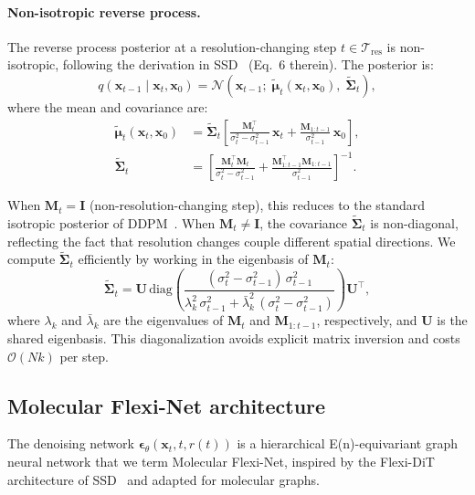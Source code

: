\documentclass[11pt]{article}
\newcommand{\vx}{\mathbf{x}}
\newcommand{\ve}{\boldsymbol{\epsilon}}
\newcommand{\mM}{\mathbf{M}}
\newcommand{\mI}{\mathbf{I}}
\newcommand{\mU}{\mathbf{U}}
\newcommand{\normal}{\mathcal{N}}
\begin{document}
\paragraph{Non-isotropic reverse process.}
The reverse process posterior at a resolution-changing step $t \in \mathcal{T}_{\text{res}}$ is non-isotropic, following the derivation in SSD~\cite{ssd2026} (Eq.~6 therein). The posterior is:
\begin{equation}
\label{eq:posterior}
    q(\vx_{t-1} \mid \vx_t, \vx_0) = \normal\!\left(\vx_{t-1};\; \tilde{\boldsymbol{\mu}}_t(\vx_t, \vx_0),\; \tilde{\boldsymbol{\Sigma}}_t\right),
\end{equation}
where the mean and covariance are:
\begin{align}
    \tilde{\boldsymbol{\mu}}_t(\vx_t, \vx_0) &= \tilde{\boldsymbol{\Sigma}}_t \left[\frac{\mM_t^\top}{\sigma_t^2 - \sigma_{t-1}^2}\,\vx_t + \frac{\mM_{1:t-1}}{\sigma_{t-1}^2}\,\vx_0\right], \label{eq:posterior_mean}\\[6pt]
    \tilde{\boldsymbol{\Sigma}}_t &= \left[\frac{\mM_t^\top\mM_t}{\sigma_t^2 - \sigma_{t-1}^2} + \frac{\mM_{1:t-1}^\top\mM_{1:t-1}}{\sigma_{t-1}^2}\right]^{-1}. \label{eq:posterior_cov}
\end{align}

When $\mM_t = \mI$ (non-resolution-changing step), this reduces to the standard isotropic posterior of DDPM~\cite{ho2020ddpm}. When $\mM_t \neq \mI$, the covariance $\tilde{\boldsymbol{\Sigma}}_t$ is non-diagonal, reflecting the fact that resolution changes couple different spatial directions. We compute $\tilde{\boldsymbol{\Sigma}}_t$ efficiently by working in the eigenbasis of $\mM_t$:
\begin{equation}
    \tilde{\boldsymbol{\Sigma}}_t = \mU\,\text{diag}\!\left(\frac{(\sigma_t^2 - \sigma_{t-1}^2)\,\sigma_{t-1}^2}{\lambda_k^2\,\sigma_{t-1}^2 + \bar{\lambda}_k^2\,(\sigma_t^2 - \sigma_{t-1}^2)}\right)\mU^\top,
\end{equation}
where $\lambda_k$ and $\bar{\lambda}_k$ are the eigenvalues of $\mM_t$ and $\mM_{1:t-1}$, respectively, and $\mU$ is the shared eigenbasis. This diagonalization avoids explicit matrix inversion and costs $\mathcal{O}(Nk)$ per step.


\subsection*{Molecular Flexi-Net architecture}

The denoising network $\ve_\theta(\vx_t, t, r(t))$ is a hierarchical E(n)-equivariant graph neural network that we term Molecular Flexi-Net, inspired by the Flexi-DiT architecture of SSD~\cite{ssd2026} and adapted for molecular graphs.
\end{document}
